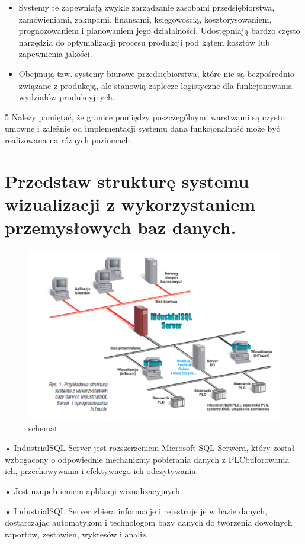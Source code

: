 \documentclass{article}
\begin{document}
       	\begin{itemize}
       	\item Systemy te zapewniają zwykle zarządzanie zasobami przedsiębiorstwa,
       	zamówieniami, zakupami, finansami, księgowością, kosztorysowaniem,
       	prognozowaniem i planowaniem jego działalności. Udostępniają bardzo często
       	narzędzia do optymalizacji procesu produkcji pod kątem kosztów lub
       	zapewnienia jakości.
       	\item Obejmują tzw. systemy biurowe przedsiębiorstwa, które nie są bezpośrednio
       	związane z produkcją, ale stanowią zaplecze logistyczne dla funkcjonowania
       	wydziałów produkcyjnych.
       	       	\end{itemize}5
       	Należy pamiętać, że granice pomiędzy poszczególnymi warstwami są czysto
       	umowne i zależnie od implementacji systemu dana funkcjonalność może być
       	realizowana na różnych poziomach.
       	
	\section{Przedstaw strukturę systemu wizualizacji z wykorzystaniem przemysłowych baz	danych.}
	\begin{figure}[!htb]
		\centering
		\includegraphics[width=0.7\linewidth]{industrialSQL}
		\caption{schemat}
		\label{fig:industrialsql}
	\end{figure}
	
	• IndustrialSQL Server jest rozszerzeniem Microsoft SQL Serwera, który
	został wzbogacony o odpowiednie mechanizmy pobierania danych z PLCbuforowania ich, przechowywania i efektywnego ich odczytywania.
	
	• Jest uzupełnieniem aplikacji wizualizacyjnych.
	
	• IndustrialSQL Server zbiera informacje i rejestruje je w bazie danych,
	dostarczając automatykom i technologom bazy danych do tworzenia
	dowolnych raportów, zestawień, wykresów i analiz.
	
\end{document}
